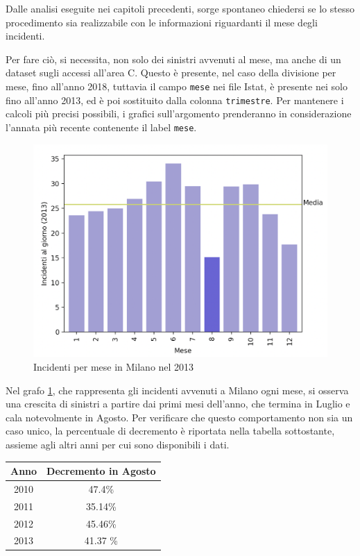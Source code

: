 \documentclass[a4paper,12pt]{report}
\newcommand{\columnstyle}[1]{\texttt{#1}}
\begin{document}
Dalle analisi eseguite nei capitoli precedenti, sorge spontaneo chiedersi se lo stesso 
procedimento sia realizzabile con le informazioni riguardanti il mese degli 
incidenti. 

Per fare ciò, si necessita, non solo dei sinistri avvenuti al mese, 
ma anche di un dataset sugli accessi all'area C. 
Questo è presente, nel caso della divisione per 
mese, fino all'anno 2018, tuttavia il campo \columnstyle{mese} nei file Istat, è 
presente nei solo fino all'anno 2013, ed è poi sostituito 
dalla colonna \columnstyle{trimestre}. 
Per mantenere i calcoli più precisi possibili, i grafici sull'argomento prenderanno 
in considerazione l'annata più recente contenente il label \columnstyle{mese}.

\begin{figure}
    \hfill\includegraphics[width=0.7\linewidth]{../src/incidenti/incidenti_senza_coords/mese_incidenti/milano_mese.png}\hspace*{\fill}
    \caption{Incidenti per mese in Milano nel 2013}
    \label{fig:milano-mese}
\end{figure}

Nel grafo \ref{fig:milano-mese}, che rappresenta gli incidenti avvenuti a Milano ogni mese, 
si osserva una crescita di sinistri a partire dai primi mesi 
dell'anno, che termina in Luglio e cala notevolmente in Agosto.
Per verificare che questo comportamento non sia 
un caso unico, la percentuale di decremento è riportata nella tabella sottostante, 
assieme agli altri anni per cui sono disponibili i dati.

\begin{center}
    \def\arraystretch{1.5}%
    \begin{tabular}{ |c|c| } 
        \hline
        Anno & Decremento in Agosto \\ 
        \hline
        2010 & 47.4\%  \\ 
        \rowcolor{TableGray}
        2011 & 35.14\% \\
        2012 & 45.46\% \\
        \rowcolor{TableGray}
        2013 & 41.37 \% \\
        \hline
    \end{tabular}
\end{center}
\end{document}

